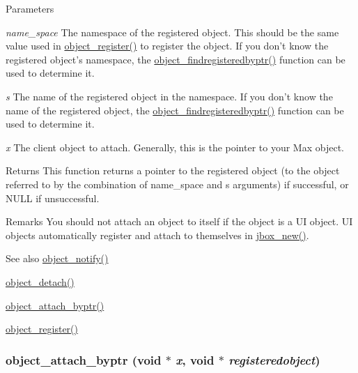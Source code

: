 \begin{DoxyParams}{Parameters}
\item[{\em name\_\-space}]The namespace of the registered object. This should be the same value used in \hyperlink{group__obj_gaaa97beba179d6aebd3f3ede1b5c781fa}{object\_\-register()} to register the object. If you don't know the registered object's namespace, the \hyperlink{group__obj_gadeb570bcae0e9bbf389d571e85d16bfa}{object\_\-findregisteredbyptr()} function can be used to determine it. \item[{\em s}]The name of the registered object in the namespace. If you don't know the name of the registered object, the \hyperlink{group__obj_gadeb570bcae0e9bbf389d571e85d16bfa}{object\_\-findregisteredbyptr()} function can be used to determine it. \item[{\em x}]The client object to attach. Generally, this is the pointer to your Max object.\end{DoxyParams}
\begin{DoxyReturn}{Returns}
This function returns a pointer to the registered object (to the object referred to by the combination of {\ttfamily name\_\-space} and {\ttfamily s} arguments) if successful, or NULL if unsuccessful.
\end{DoxyReturn}
\begin{DoxyRemark}{Remarks}
You should not attach an object to itself if the object is a UI object. UI objects automatically register and attach to themselves in \hyperlink{group__jbox_gaaa460d02ca3d22c54368ade59d8e330b}{jbox\_\-new()}.
\end{DoxyRemark}
\begin{DoxySeeAlso}{See also}
\hyperlink{group__obj_ga6297b81c3a70f7fb2201c7262e96bba3}{object\_\-notify()} 

\hyperlink{group__obj_ga6765e9533a3ae0d67d302f1e038c66ac}{object\_\-detach()} 

\hyperlink{group__obj_ga76657298bcd43ae4f9098e3ed2b97c72}{object\_\-attach\_\-byptr()} 

\hyperlink{group__obj_gaaa97beba179d6aebd3f3ede1b5c781fa}{object\_\-register()} 
\end{DoxySeeAlso}
\hypertarget{group__obj_ga76657298bcd43ae4f9098e3ed2b97c72}{
\subsubsection[{object\_\-attach\_\-byptr}]{ object\_\-attach\_\-byptr (void $\ast$ {\em x}, \/  void $\ast$ {\em registeredobject})}}
\label{group__obj_ga76657298bcd43ae4f9098e3ed2b97c72}


